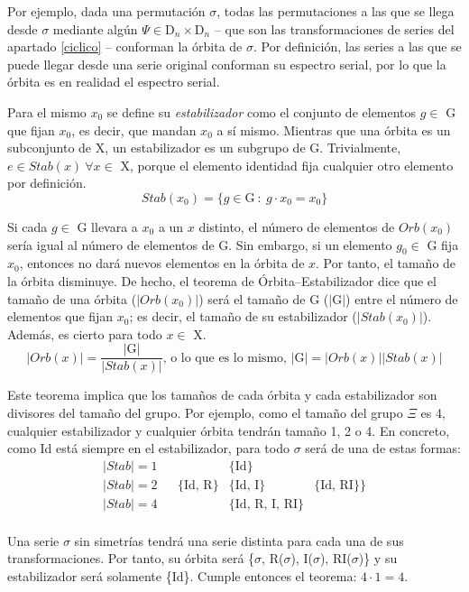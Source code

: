 		Por ejemplo, dada una permutación $\sigma$, todas las permutaciones a las que se llega desde $\sigma$ mediante algún $\Psi\in\text{D}_{n}\times\text{D}_{n}$ -- que son las transformaciones de series del apartado \ref{ciclico} -- conforman la órbita de $\sigma$. Por definición, las series a las que se puede llegar desde una serie original conforman su espectro serial, por lo que la órbita es en realidad el espectro serial.
	
		Para el mismo $x_0$ se define su \emph{estabilizador} como el conjunto de elementos $g\in$ G que fijan $x_0$, es decir, que mandan $x_0$ a sí mismo. Mientras que una órbita es un subconjunto de X, un estabilizador es un subgrupo de G. Trivialmente, $e\in Stab(x) \ \forall x\in$ X, porque el elemento identidad fija cualquier otro elemento por definición.
		\[Stab(x_0)=\{g\in \text{G}\ :\ g\cdot x_0 =x_0 \}\]
	
		Si cada $g\in$ G llevara a $x_0$ a un $x$ distinto, el número de elementos de $Orb(x_0)$ sería igual al número de elementos de G. Sin embargo, si un elemento $g_0\in$ G fija $x_0$, entonces no dará nuevos elementos en la órbita de $x$. Por tanto, el tamaño de la órbita disminuye. De hecho,  el teorema de Órbita--Estabilizador dice que el tamaño de una órbita ($|Orb(x_0)|$) será el tamaño de G ($|$G$|$) entre el número de elementos que fijan $x_0$; es decir, el tamaño de su estabilizador ($|Stab(x_0)|$). Además, es cierto para todo $x\in$ X.
		\[|Orb(x)|=\frac{|\text{G}|}{|Stab(x)|}\text{, o lo que es lo mismo, }|\text{G}|=|Orb(x)||Stab(x)|\]
		
		\def\arraystretch{1.5}
		Este teorema implica que los tamaños de cada órbita y cada estabilizador son divisores del tamaño del grupo. Por ejemplo, como el tamaño del grupo $\Xi$ es 4, cualquier estabilizador y cualquier órbita tendrán tamaño 1, 2 o 4. En concreto, como Id está siempre en el estabilizador, para  todo $\sigma$ será de una de estas formas:
		\[\begin{matrix}|Stab|=1&&&\{\text{Id}\}&\\\hline|Stab|=2&&\{\text{Id, R}\}&\{\text{Id, I}\}&\{\text{Id, RI}\}\}\\\hline|Stab|=4&&&\{\text{Id, R, I, RI}\}&\\\end{matrix}\]
		
		\def\arraystretch{1}
		Una serie $\sigma$ sin simetrías tendrá una serie distinta para cada una de sus transformaciones. Por tanto, su órbita será \{$\sigma$, R($\sigma$), I($\sigma$), RI($\sigma$)\} y su estabilizador será solamente \{Id\}. Cumple entonces el teorema: $4\cdot 1 = 4$.
	
